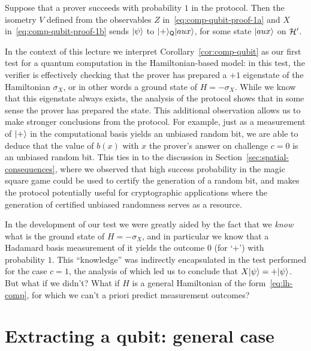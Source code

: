 \begin{corollary}\label{cor:comp-qubit}
Suppose that a prover succeeds with probability $1$ in the protocol. Then the isometry $V$ defined from the observables  $Z$ in~\eqref{eq:comp-qubit-proof-1a} and $X$ in~\eqref{eq:comp-qubit-proof-1b} sends $|\psi\rangle$ to $|+\rangle_{\textsf{Q}}|aux\rangle$, for some state $|aux\rangle$ on $\mathcal{H}'$.
\end{corollary}

In the context of this lecture we interpret Corollary~\ref{cor:comp-qubit} as our first test for a quantum computation in the Hamiltonian-based model: in this test, the verifier is effectively checking that the prover has prepared a $+1$ eigenstate of the Hamiltonian $\sigma_X$, or in other words a ground state of $H=-\sigma_X$. While we know that this eigenstate always exists, the analysis of the protocol shows that in some sense the prover has prepared the state. This additional observation allows us to make stronger conclusions from the protocol. For example, just as a measurement of $|+\rangle$ in the computational basis yields an unbiased random bit, we are able to deduce that the value of $b(x)$ with $x$ the prover's answer on challenge $c=0$ is an unbiased random bit. This ties in to the discussion in Section~\ref{sec:spatial-consequences}, where we observed that high success probability in the magic square game could be used to certify the generation of a random bit, and makes the protocol potentially useful for cryptographic applications where the generation of certified unbiased randomness serves as a resource.  

In the development of our test we were greatly aided by the fact that we \emph{know} what is the ground state of $H = -\sigma_X$, and in particular we know that a Hadamard basis measurement of it yields the outcome $0$ (for `$+$') with probability $1$. This ``knowledge'' was indirectly encapsulated in the test performed for the case $c=1$, the analysis of which led us to conclude that $X |\psi\rangle = + |\psi\rangle$. 
But what if we didn't? What if $H$ is a general Hamiltonian of the form~\eqref{eq:lh-comp}, for which we can't a priori predict measurement outcomes? 


\section{Extracting a qubit: general case}
\label{sec:extract-comp-qubit}

